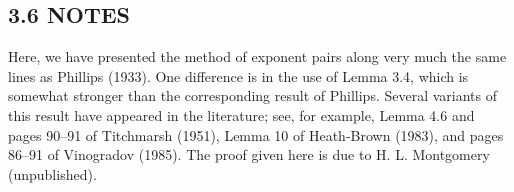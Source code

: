 \documentclass[10pt]{article}
\begin{document}
\subsection*{3.6 NOTES}

Here, we have presented the method of exponent pairs along very much the same
lines as Phillips (1933). One difference is in the use of Lemma 3.4, which is
somewhat stronger than the corresponding result of Phillips. Several variants
of this result have appeared in the literature; see, for example, Lemma 4.6
and pages 90--91 of Titchmarsh (1951), Lemma 10 of Heath-Brown (1983), and
pages 86--91 of Vinogradov (1985). The proof given here is due to H. L.
Montgomery (unpublished).
\end{document}
